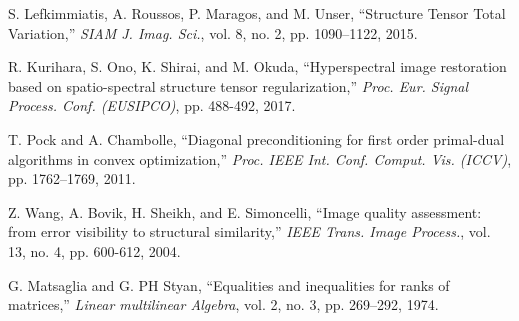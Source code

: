 \begin{thebibliography}{100}
	 S. Lefkimmiatis, A. Roussos, P. Maragos, and M. Unser, ``Structure Tensor Total Variation,'' \textit{SIAM J. Imag. Sci.}, vol. 8, no. 2, pp. 1090--1122, 2015. 
	
	 R. Kurihara, S. Ono, K. Shirai, and M. Okuda, ``Hyperspectral image restoration based on spatio-spectral structure tensor regularization,'' \textit{Proc. Eur. Signal Process. Conf. (EUSIPCO)}, pp. 488-492, 2017.
	
	
	
	
	 T. Pock and A. Chambolle, ``Diagonal preconditioning for first order primal-dual algorithms in convex optimization,'' \textit{Proc. IEEE Int. Conf. Comput. Vis. (ICCV)}, pp. 1762--1769, 2011.
	
	 Z. Wang, A. Bovik, H. Sheikh, and E. Simoncelli, ``Image quality assessment: from error visibility to structural similarity,'' \textit{IEEE Trans. Image Process.}, vol. 13, no. 4, pp. 600-612, 2004.
	
	
	 G. Matsaglia and G. PH Styan, ``Equalities and inequalities for ranks of matrices,'' \textit{Linear multilinear Algebra}, vol. 2, no. 3, pp. 269--292, 1974.
	
	
\end{thebibliography}